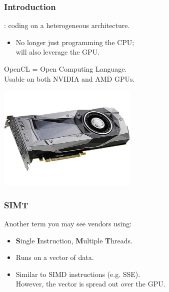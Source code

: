 \begin{frame}
  \frametitle{Introduction}


     : coding on a heterogeneous architecture.
      \begin{itemize}
        \item No longer just programming the CPU;\\ will also leverage the GPU.
      \end{itemize}
      OpenCL = Open Computing Language.\\
      Usable on both NVIDIA and AMD GPUs.
      
    \begin{center}
	\includegraphics[width=0.5\textwidth]{images/gpu.jpg}
	\end{center}

\end{frame}

\begin{frame}
  \frametitle{SIMT}



  Another term you may see vendors using:

  \begin{itemize}
    \item {\bf S}ingle {\bf I}nstruction, {\bf M}ultiple {\bf T}hreads.
    \item Runs on a vector of data.
    \item Similar to SIMD instructions (e.g. SSE).\\
     However, the vector is spread out over the GPU.
  \end{itemize}

\end{frame}


